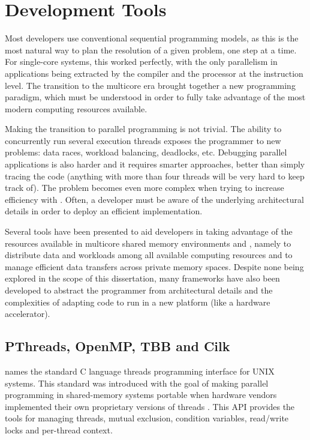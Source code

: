 \documentclass[../thesis]{subfiles}
\begin{document}
		\section{Development Tools}
		\label{sec:techbg:tools}

		Most developers use conventional sequential programming models, as this is the most natural way to plan the resolution of a given problem, one step at a time. For single-core systems, this worked perfectly, with the only parallelism in applications being extracted by the compiler and the processor at the instruction level. The transition to the multicore era brought together a new programming paradigm, which must be understood in order to fully take advantage of the most modern computing resources available.

		Making the transition to parallel programming is not trivial. The ability to concurrently run several execution threads exposes the programmer to new problems: data races, workload balancing, deadlocks, etc. Debugging parallel applications is also harder and it requires smarter approaches, better than simply tracing the code (anything with more than four threads will be very hard to keep track of). The problem becomes even more complex when trying to increase efficiency with \hetplats. Often, a developer must be aware of the underlying architectural details in order to deploy an efficient implementation.

		Several tools have been presented to aid developers in taking advantage of the resources available in multicore shared memory environments and \hetplats, namely to distribute data and workloads among all available computing resources and to manage efficient data transfers across private memory spaces. Despite none being explored in the scope of this dissertation, many frameworks have also been developed to abstract the programmer from architectural details and the complexities of adapting code to run in a new platform (like a hardware accelerator).

		\subsection{PThreads, OpenMP, TBB and Cilk}

		\pthreads names the standard C language threads programming interface for UNIX systems. This standard was introduced with the goal of making parallel programming in shared-memory systems portable when hardware vendors implemented their own proprietary versions of threads \cite{LLNL:Barney:pthreads}. This API provides the tools for managing threads, mutual exclusion, condition variables, read/write locks and per-thread context.
\end{document}
